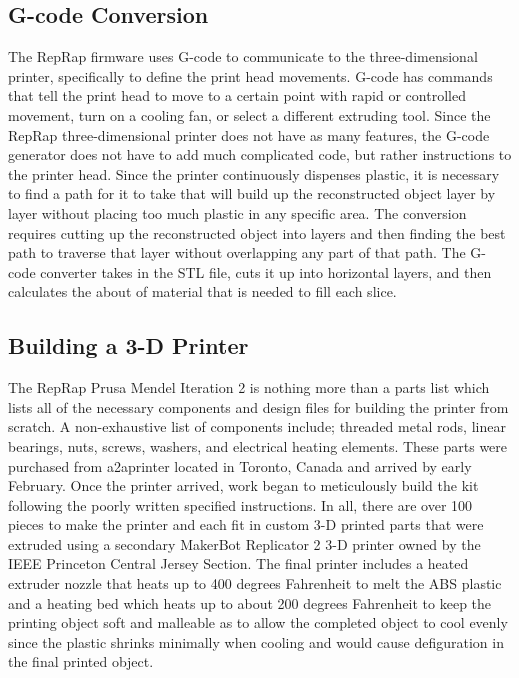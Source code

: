 \documentclass[pdftex,10.5pt]{report}
\begin{document}
\subsection{G-code Conversion}
The RepRap firmware uses G-code to communicate to the three-dimensional printer, specifically to define the print head movements. G-code has commands that tell the print head to move to a certain point with rapid or controlled movement, turn on a cooling fan, or select a different extruding tool. Since the RepRap three-dimensional printer does not have as many features, the G-code generator does not have to add much complicated code, but rather instructions to the printer head. Since the printer continuously dispenses plastic, it is necessary to find a path for it to take that will build up the reconstructed object layer by layer without placing too much plastic in any specific area. The conversion requires cutting up the reconstructed object into layers and then finding the best path to traverse that layer without overlapping any part of that path. The G-code converter takes in the STL file, cuts it up into horizontal layers, and then calculates the about of material that is needed to fill each slice. 

\subsection{Building a 3-D Printer}
The RepRap Prusa Mendel Iteration 2 is nothing more than a parts list which lists all of the necessary components and design files for building the printer from scratch. A non-exhaustive list of components include; threaded metal rods, linear bearings, nuts, screws, washers, and electrical heating elements. These parts were purchased from a2aprinter located in Toronto, Canada and arrived by early February. Once the printer arrived, work began to meticulously build the kit following the poorly written specified instructions. In all, there are over 100 pieces to make the printer and each fit in custom 3-D printed parts that were extruded using a secondary MakerBot Replicator 2 3-D printer owned by the IEEE Princeton Central Jersey Section. The final printer includes a heated extruder nozzle that heats up to 400 degrees Fahrenheit to melt the ABS plastic and a heating bed which heats up to about 200 degrees Fahrenheit to keep the printing object soft and malleable as to allow the completed object to cool evenly since the plastic shrinks minimally when cooling and would cause defiguration in the final printed object.
\end{document}
